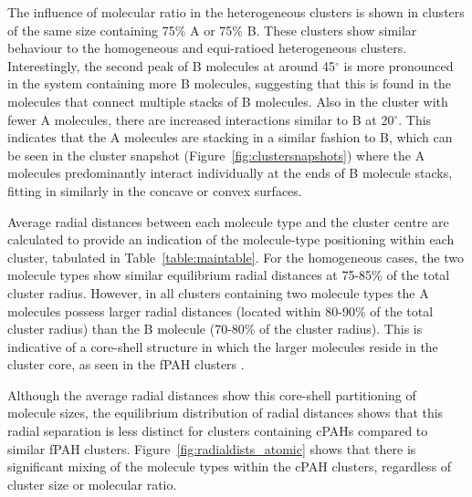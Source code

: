 The influence of molecular ratio in the heterogeneous clusters is shown in clusters of the same size containing 75\% A or 75\% B. These clusters show similar behaviour to the homogeneous and equi-ratioed heterogeneous clusters.  Interestingly, the second peak of B molecules at around 45$^{\circ}$ is more pronounced in the system containing more B molecules, suggesting that this is found in the molecules that connect multiple stacks of B molecules.  Also in the cluster with fewer A molecules, there are increased interactions similar to B at 20$^{\circ}$. This indicates that the A molecules are stacking in a similar fashion to B, which can be seen in the cluster snapshot (Figure~\ref{fig:clustersnapshots}) where the A molecules predominantly interact individually at the ends of B molecule stacks, fitting in similarly in the concave or convex surfaces.

Average radial distances between each molecule type and the cluster centre are calculated to provide an indication of the molecule-type positioning within each cluster, tabulated in  Table~\ref{table:maintable}. For the homogeneous cases, the two molecule types show similar equilibrium radial distances at 75-85\% of the total cluster radius. However, in all clusters containing two molecule types the A molecules possess larger radial distances (located within 80-90\% of the total cluster radius) than the B molecule (70-80\% of the cluster radius). This is indicative of a core-shell structure in which the larger molecules reside in the cluster core, as seen in the fPAH clusters \cite{bowal2018partitioning}.

Although the average radial distances show this core-shell partitioning of molecule sizes, the equilibrium distribution of radial distances shows that this radial separation is less distinct for clusters containing cPAHs compared to similar fPAH clusters. Figure~\ref{fig:radialdists_atomic} shows that there is significant mixing of the molecule types within the cPAH clusters, regardless of cluster size or molecular ratio.

